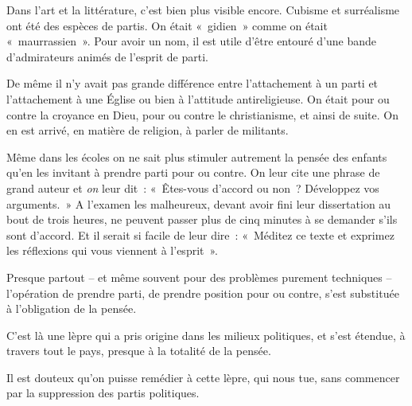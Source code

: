 \documentclass[french,twoside]{book} %
\newif\ifdev
\renewcommand{\LettrineFontHook}{\color{rubric}}
\newcommand{\initialiv}[2]{%
  \let\oldLFH\LettrineFontHook
  \IfSubStr{QJ’}{#1}{
    \lettrine[lines=4, lhang=0.2, loversize=-0.1, lraise=0.2]{\smash{#1}}{#2}
  }{\IfSubStr{É}{#1}{
    \lettrine[lines=4, lhang=0.2, loversize=-0, lraise=0]{\smash{#1}}{#2}
  }{\IfSubStr{ÀÂ}{#1}{
    \lettrine[lines=4, lhang=0.2, loversize=-0, lraise=0, slope=0.6em]{\smash{#1}}{#2}
  }{\IfSubStr{A}{#1}{
    \lettrine[lines=4, lhang=0.2, loversize=0.2, slope=0.6em]{\smash{#1}}{#2}
  }{\IfSubStr{V}{#1}{
    \lettrine[lines=4, lhang=0.2, loversize=0.2, slope=-0.5em]{\smash{#1}}{#2}
  }{
    \lettrine[lines=4, lhang=0.2, loversize=0.2]{\smash{#1}}{#2}
  }}}}}
  \let\LettrineFontHook\oldLFH
}
\renewcommand{\LettrineFontHook}{\bfseries\color{rubric}}
\begin{document}
Dans l’art et la littérature, c’est bien plus visible encore. Cubisme et surréalisme ont été des espèces de partis. On était « gidien » comme on était « maurrassien ». Pour avoir un nom, il est utile d’être entouré d’une bande d’admirateurs animés de l’esprit de parti.\par
De même il n’y avait pas grande différence entre l’attachement à un parti et l’attachement à une Église ou bien à l’attitude antireligieuse. On était pour ou contre la croyance en Dieu, pour ou contre le christianisme, et ainsi de suite. On en est arrivé, en matière de religion, à parler de militants.\par
Même dans les écoles on ne sait plus stimuler autrement la pensée des enfants qu’en les invitant à prendre parti pour ou contre. On leur cite une phrase de grand auteur et \emph{on} leur dit : « Êtes-vous d’accord ou non ? Développez vos arguments. » A l’examen les malheureux, devant avoir fini leur dissertation au bout de trois heures, ne peuvent passer plus de cinq minutes à se demander s’ils sont d’accord. Et il serait si facile de leur dire : « Méditez ce texte et exprimez les réflexions qui vous viennent à l’esprit ».\par
Presque partout – et même souvent pour des problèmes purement techniques – l’opération de prendre parti, de prendre position pour ou contre, s’est substituée à l’obligation de la pensée.\par
C’est là une lèpre qui a pris origine dans les milieux politiques, et s’est étendue, à travers tout le pays, presque à la totalité de la pensée.\par
Il est douteux qu’on puisse remédier à cette lèpre, qui nous tue, sans commencer par la suppression des partis politiques.
 


\ifbooklet
  \newpage\null\thispagestyle{empty}\newpage
\fi

\ifdev %
\fontname\font — \textsc{Les règles du jeu}\par
(\hyperref[utopie]{\underline{Lien}})\par
\noindent \initialiv{A}{lors là}\blindtext\par
\noindent \initialiv{À}{ la bonheur des dames}\blindtext\par
\noindent \initialiv{É}{tonnez-le}\blindtext\par
\noindent \initialiv{Q}{ualitativement}\blindtext\par
\noindent \initialiv{V}{aloriser}\blindtext\par
\Blindtext
\phantomsection
\label{utopie}
\Blinddocument
\fi
\end{document}
